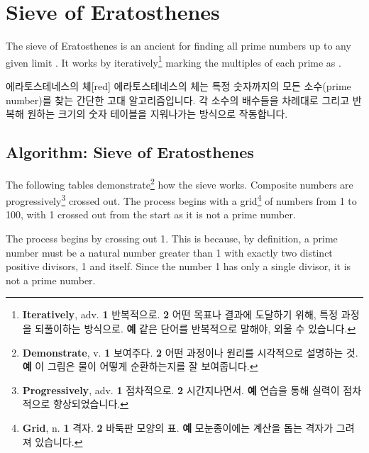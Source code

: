 \documentclass[12pt]{book}
\begin{document}
  
  \twosidedpaper\section{Sieve of Eratosthenes}
  The sieve of Eratosthenes is an ancient  for finding all 
  prime numbers up to any given limit \parencite{noauthor_sieve_2025}.
  It works by iteratively\footnote{
    \textbf{Iteratively}, adv. \textbf{1} 반복적으로. \textbf{2} 어떤 
    목표나 결과에 도달하기 위해, 특정 과정을 되풀이하는 방식으로.
    \textbf{예} 같은 단어를 반복적으로 말해야, 외울 수 있습니다.
  } marking the multiples of each prime as . 
  \begin{flexbox}{에라토스테네스의 체}[red]
    에라토스테네스의 체는 특정 숫자까지의 모든 소수(prime number)를 찾는 간단한 고대 알고리즘입니다. 
    각 소수의 배수들을 차례대로 그리고 반복해 원하는 크기의 숫자 테이블을 지워나가는 방식으로 작동합니다.
  \end{flexbox}

  \subsection*{Algorithm: Sieve of Eratosthenes}

  The following tables demonstrate\footnote{
    \textbf{Demonstrate}, v. \textbf{1} 보여주다. \textbf{2} 어떤 과정이나 원리를 
    시각적으로 설명하는 것.
    \textbf{예} 이 그림은 물이 어떻게 순환하는지를 잘 보여줍니다.
  } how the sieve works. Composite numbers are progressively\footnote{
    \textbf{Progressively}, adv. \textbf{1} 점차적으로. \textbf{2} 시간지나면서. 
    \textbf{예} 연습을 통해 실력이 점차적으로 향상되었습니다.
  } crossed out. The process begins with a grid\footnote{
    \textbf{Grid}, n. \textbf{1} 격자. \textbf{2} 바둑판 모양의 표. \textbf{예} 
    모눈종이에는 계산을 돕는 격자가 그려져 있습니다.
  } of numbers from 1 to 100, with 1 crossed out from the start as it is 
  not a prime number.


  The process begins by crossing out 1. This is because, by definition, a prime number must be a 
  natural number greater than 1 with exactly two distinct positive divisors, 1 and itself. 
  Since the number 1 has only a single divisor, it is not a prime number.
\end{document}
